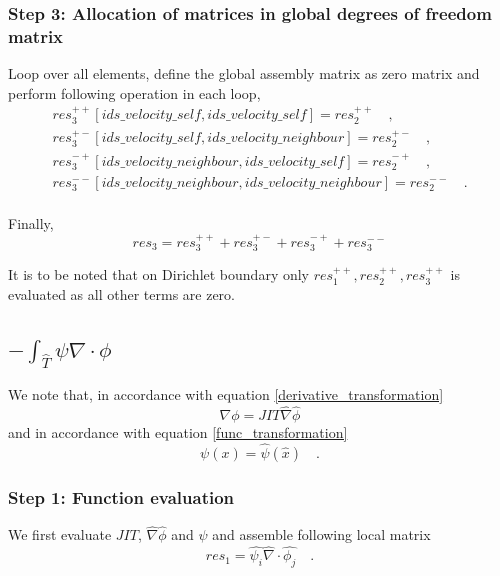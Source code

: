 \documentclass[a4paper,openany]{book}
\begin{document}
\subsubsection{Step 3: Allocation of matrices in global degrees of freedom matrix} 

Loop over all elements, define the global assembly matrix as zero matrix and perform following operation in each loop,
\begin{equation}
\begin{split}
res_3^{++}[ids\_velocity\_self,ids\_velocity\_self] = res_2^{++} \quad \textrm{,}\\
res_3^{+-}[ids\_velocity\_self,ids\_velocity\_neighbour] = res_2^{+-} \quad \textrm{,}\\
res_3^{-+}[ids\_velocity\_neighbour,ids\_velocity\_self] = res_2^{-+} \quad \textrm{,}\\
res_3^{--}[ids\_velocity\_neighbour,ids\_velocity\_neighbour] = res_2^{--} \quad \textrm{.}\\
\end{split}
\end{equation}

Finally,
\begin{equation}
res_3 = res_3^{++} + res_3^{+-} + res_3^{-+} + res_3^{--} 
\end{equation}

It is to be noted that on Dirichlet boundary only $res_1^{++}, res_2^{++}, res_3^{++}$ is evaluated as all other terms are zero.

\subsection{$-\int_{\hat{T}} \psi \nabla \cdot \phi$}

We note that, in accordance with equation \eqref{derivative_transformation}
\begin{equation}
\nabla \phi = JIT \hat{\nabla} \hat{\phi}
\end{equation}
and in accordance with equation \eqref{func_transformation}
\begin{equation}
\psi(x) = \hat{\psi} (\hat{x}) \quad \textrm{.}
\end{equation}

\subsubsection{Step 1: Function evaluation}
We first evaluate $JIT$, $\hat{\nabla} \hat{\phi}$ and $\psi$ and assemble following local matrix\\
\begin{equation}
res_1 = \hat{\psi_i} \hat{\nabla} \cdot \hat{\phi_j} \quad \textrm{.}
\end{equation}
\end{document}
